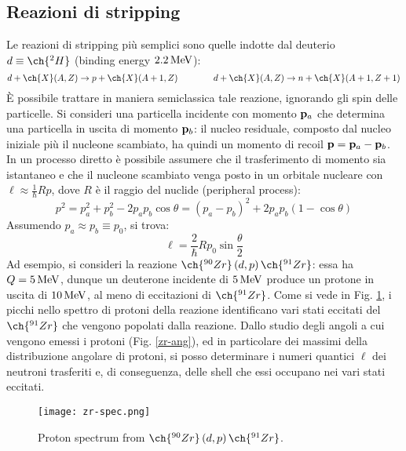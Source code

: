 \subsection{Reazioni di stripping}

Le reazioni di stripping più semplici sono quelle indotte dal deuterio $ d \equiv \ch{^2H} $ (binding energy $ 2.2\,\mathrm{MeV} $):
\begin{equation*}
	d + \ch{X}(A,Z) \rightarrow p + \ch{X}(A+1,Z)
	\qquad \qquad
	d + \ch{X}(A,Z) \rightarrow n + \ch{X}(A+1,Z+1)
\end{equation*}
È possibile trattare in maniera semiclassica tale reazione, ignorando gli spin delle particelle. Si consideri una particella incidente con momento $ \mathbf{p}_a $ che determina una particella in uscita di momento $ \mathbf{p}_b $: il nucleo residuale, composto dal nucleo iniziale più il nucleone scambiato, ha quindi un momento di recoil $ \mathbf{p} = \mathbf{p}_a - \mathbf{p}_b $. In un processo diretto è possibile assumere che il trasferimento di momento sia istantaneo e che il nucleone scambiato venga posto in un orbitale nucleare con $ \ell \approx \frac{1}{\hbar} Rp $, dove $ R $ è il raggio del nuclide (peripheral process):
\begin{equation*}
	p^2 = p_a^2 + p_b^2 - 2 p_a p_b \cos \theta = \left( p_a - p_b \right)^2 + 2 p_a p_b \left( 1 - \cos \theta \right)
\end{equation*}
Assumendo $ p_a \approx p_b \equiv p_0 $, si trova:
\begin{equation}
	\ell = \frac{2}{\hbar} R p_0 \sin \frac{\theta}{2}
	\label{eq:6.7}
\end{equation}
Ad esempio, si consideri la reazione $ \ch{^{90}Zr} \left( d,p \right) \ch{^{91}Zr} $: essa ha $ Q = 5\,\mathrm{MeV} $, dunque un deuterone incidente di $ 5\,\mathrm{MeV} $ produce un protone in uscita di $ 10\,\mathrm{MeV} $, al meno di eccitazioni di $ \ch{^{91}Zr} $.
Come si vede in Fig. \ref{zr-spec}, i picchi nello spettro di protoni della reazione identificano vari stati eccitati del $ \ch{^{91}Zr} $ che vengono popolati dalla reazione. Dallo studio degli angoli a cui vengono emessi i protoni (Fig. \ref{zr-ang}), ed in particolare dei massimi della distribuzione angolare di protoni, si posso determinare i numeri quantici $ \ell $ dei neutroni trasferiti e, di conseguenza, delle shell che essi occupano nei vari stati eccitati.

\begin{figure}[H]
	\centering
	\texttt{[image: zr-spec.png]}
	\caption{Proton spectrum from $ \ch{^{90}Zr} \left( d,p \right) \ch{^{91}Zr} $.}
	\label{zr-spec}
\end{figure}


